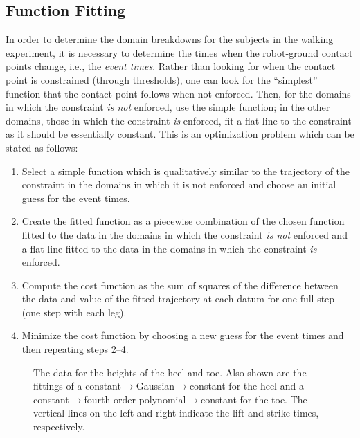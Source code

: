 \subsection{Function Fitting}
In order to determine the domain breakdowns for the subjects in the walking
experiment, it is necessary to determine the times when the robot-ground contact
points change, i.e., the {\em event times}.
%
Rather than looking for when the contact point is constrained (through
thresholds), one can look for the ``simplest'' function that the contact point
follows when not enforced.
%
Then, for the domains in which the constraint {\em is not} enforced, use the
simple function; in the other domains, those in which the constraint {\em is}
enforced, fit a flat line to the constraint as it should be essentially
constant.
%
This is an optimization problem which can be stated as follows:
\begin{enumerate}
\item Select a simple function which is qualitatively similar to the trajectory
  of the constraint in the domains in which it is not enforced and choose an
  initial guess for the event times.
\item Create the fitted function as a piecewise combination of the chosen
  function fitted to the data in the domains in which the constraint {\em is
    not} enforced and a flat line fitted to the data in the domains in which
  the constraint {\em is} enforced.
\item Compute the cost function as the sum of squares of the difference between
  the data and value of the fitted trajectory at each datum for one full step
  (one step with each leg).
\item Minimize the cost function by choosing a new guess for the event times
  and then repeating steps 2--4.
\end{enumerate}

\begin{figure}[t!]
  \centering
  \caption[The data for the heights of the heel and toe.]{The data for the
    heights of the heel and toe.
    Also shown are the fittings of a constant$\to$Gaussian$\to$constant for the
    heel and a constant$\to$fourth-order polynomial$\to$constant for the toe.
    The vertical lines on the left and right indicate the lift and strike times,
    respectively.}
  \label{fig:heeltoefit}
\end{figure}


